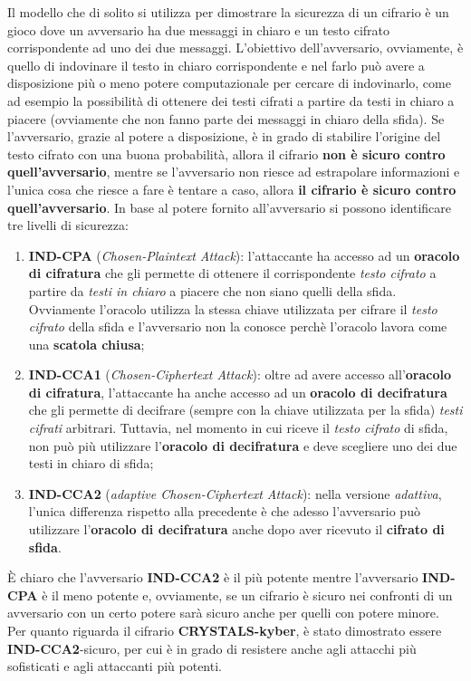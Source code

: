 Il modello che di solito si utilizza per dimostrare la sicurezza di un cifrario è un gioco dove un avversario ha due messaggi in chiaro e un testo cifrato corrispondente ad uno dei due messaggi. L'obiettivo dell'avversario, ovviamente, è quello di indovinare il testo in chiaro corrispondente e nel farlo può avere a disposizione più o meno potere computazionale per cercare di indovinarlo, come ad esempio la possibilità di ottenere dei testi cifrati a partire da testi in chiaro a piacere (ovviamente che non fanno parte dei messaggi in chiaro della sfida). Se l'avversario, grazie al potere a disposizione, è in grado di stabilire l'origine del testo cifrato con una buona probabilità, allora il cifrario \textbf{non è sicuro contro quell'avversario}, mentre se l'avversario non riesce ad estrapolare informazioni e l'unica cosa che riesce a fare è tentare a caso, allora \textbf{il cifrario è sicuro contro quell'avversario}. In base al potere fornito all'avversario si possono identificare tre livelli di sicurezza:  

\begin{enumerate}
    \item \textbf{IND-CPA} (\emph{Chosen-Plaintext Attack}): l'attaccante ha accesso ad un \textbf{oracolo di cifratura} che gli permette di ottenere il corrispondente \emph{testo cifrato} a partire da \emph{testi in chiaro} a piacere che non siano quelli della sfida. Ovviamente l'oracolo utilizza la stessa chiave utilizzata per cifrare il \emph{testo cifrato} della sfida e l'avversario non la conosce perchè l'oracolo lavora come una \textbf{scatola chiusa};
    \item \textbf{IND-CCA1} (\emph{Chosen-Ciphertext Attack}): oltre ad avere accesso all'\textbf{oracolo di cifratura}, l'attaccante ha anche accesso ad un \textbf{oracolo di decifratura} che gli permette di decifrare (sempre con la chiave utilizzata per la sfida) \emph{testi cifrati} arbitrari. Tuttavia, nel momento in cui riceve il \emph{testo cifrato} di sfida, non può più utilizzare l'\textbf{oracolo di decifratura} e deve scegliere uno dei due testi in chiaro di sfida;
    \item \textbf{IND-CCA2} (\emph{adaptive Chosen-Ciphertext Attack}): nella versione \emph{adattiva}, l'unica differenza rispetto alla precedente è che adesso l'avversario può utilizzare l'\textbf{oracolo di decifratura} anche dopo aver ricevuto il \textbf{cifrato di sfida}.
\end{enumerate}

È chiaro che l'avversario \textbf{IND-CCA2} è il più potente mentre l'avversario \textbf{IND-CPA} è il meno potente e, ovviamente, se un cifrario è sicuro nei confronti di un avversario con un certo potere sarà sicuro anche per quelli con potere minore. \cite{wikipedia_cipher_security}\\
Per quanto riguarda il cifrario \textbf{CRYSTALS-kyber}, è stato dimostrato essere \textbf{IND-CCA2}-sicuro, per cui è in grado di resistere anche agli attacchi più sofisticati e agli attaccanti più potenti. \cite{kyber}

